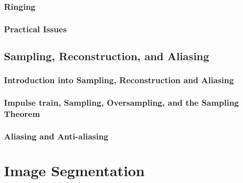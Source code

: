 \subsubsection{Ringing} 
\label{booksection_52_Ringing}

\subsubsection{Practical Issues} 
\label{booksection_53_Practical_Issues}

\subsection{Sampling, Reconstruction, and Aliasing} 
\label{booksection_54_Sampling_Reconstruction_and_Aliasing}
\subsubsection{Introduction into Sampling, Reconstruction and Aliasing} 
\label{booksection_55_Introduction_into_Sampling_Reconstruction_and_Aliasing}

\subsubsection{Impulse train, Sampling, Oversampling, and the Sampling Theorem} 
\label{booksection_56_Impulse_train_Sampling_Oversampling_and_the_Sampling_Theorem}

\subsubsection{Aliasing and Anti-aliasing} 
\label{booksection_57_Aliasing_and_Anti-aliasing}

\section{Image Segmentation} 
\label{booksection_58_Image_Segmentation}
